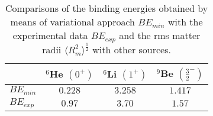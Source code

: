 \documentclass[
12pt, %
oneside, %
english, %
onehalfspacing, %
onehalfspacing, %
headsepline, %
]{MastersDoctoralThesis} %
\begin{document}
\begin{table}[bp]
\caption{Comparisons of the binding energies obtained by means of variational approach $BE_{min}$ with the experimental data $BE_{exp}$ and the rms matter radii $\langle R_m^2 \rangle^{\frac{1}{2}}$ with other sources.  }
\label{tab:rms_matter}
\begin{tabular*}{\textwidth}{@{\extracolsep{\fill}}lccc@{}}
\toprule
 & $^6$He                                                                                                                                                  $(0^+)$ & $^6$Li                                                                                                                                                                                                                                                                                                  $(1^+)$  & $^9$Be                                                                                                                                                                                                                                                                                                  $(\frac{3}{2}^-)$  \\ \midrule
$BE_{min}$                                 & $0.228$                                                                                                                                                                                          & $3.258$                                                                                                                                                                                                                                                                                                 & $1.417$                                                                                                                                                                                                                                                                                                 \\
$BE_{exp}$                                & $0.97$                                                                                                                                                                                           & $3.70$                                                                                                                                                                                                                                                                                                  & $1.57$                                                                                                                                                                                                                                                                                                  \\

\end{tabular*}
\end{table}
\end{document}
